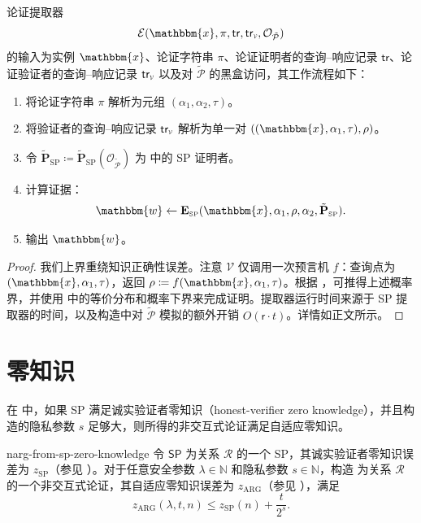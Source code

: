\documentclass[american,singlepageview]{snargs-book-zh}
\newcommand{\Malicious}[1]{\tilde{#1}}
\newcommand{\DefineEqual}{\coloneqq}
\newcommand{\BlackBox}[1]{\mathcal{O}_{#1}}
\newcommand{\Naturals}{\mathbb{N}}
\newcommand{\Relation}{\mathcal{R}}
\newcommand{\Instance}{\mathbbm{x}}
\newcommand{\Witness}{\mathbbm{w}}
\newcommand{\InstanceSize}{n}
\newcommand{\ProtoProver}{P}
\newcommand{\ProtoVerifier}{V}
\newcommand{\ProtoExtractor}{E}
\newcommand{\ProtoSalt}{\tau}
\newcommand{\ProtoZKError}{z}
\newcommand{\ProtoRandomnessComplexity}{\mathsf{r}}
\newcommand{\SPSymbol}{\mathsf{SP}}
\newcommand{\SPSubscript}{\scriptscriptstyle\mathrm{SP}}
\newcommand{\SPFormat}[1]{\mathbf{#1}}
\newcommand{\SPExtractor}{\SPFormat{\ProtoExtractor}_{\SPSubscript}}
\newcommand{\SPZKError}{\ProtoZKError_{\SPSubscript}}
\newcommand{\SPMaliciousProver}{\Malicious{\SPFormat{\ProtoProver}}_{\SPSubscript}}
\newcommand{\SPCommitment}{\alpha_{1}}
\newcommand{\SPChallenge}{\rho}
\newcommand{\SPResponse}{\alpha_{2}}
\newcommand{\SPRandomnessComplexity}{\ProtoRandomnessComplexity}
\newcommand{\ARGSubscript}{\scriptscriptstyle\mathrm{ARG}}
\newcommand{\ARGFormat}[1]{\mathcal{#1}}
\newcommand{\ARGProver}{\ARGFormat{\ProtoProver}}
\newcommand{\ARGVerifier}{\ARGFormat{\ProtoVerifier}}
\newcommand{\ARGExtractor}{\ARGFormat{\ProtoExtractor}}
\newcommand{\ARGString}{\pi}
\newcommand{\ARGZKError}{\ProtoZKError_{\ARGSubscript}}
\newcommand{\ROFunction}{f}
\newcommand{\ROQueryBound}{t}
\newcommand{\SecurityParameter}{\lambda}
\newcommand{\PrivacyParameter}{s}
\newcommand{\ROTrace}{\mathsf{tr}}
\newcommand{\ROTraceVerifier}{\ROTrace_{\scalebox{0.5}{$\ARGVerifier$}}}
\newcommand{\RandSaltString}{\ProtoSalt}
\newcommand{\RandSaltSize}{s}
\newcommand{\SPFSARGString}{(\SPCommitment,\SPResponse,\RandSaltString)}
\newcommand{\FSSPZKExpression}{\SPZKError(\InstanceSize)+\frac{\ROQueryBound}{2^{\RandSaltSize}}}
\begin{document}
\begin{construction}
\label{construction:fs-for-sp-adaptive-extractor}
论证提取器
\[
  \ARGExtractor(\Instance,\ARGString,\ROTrace,\ROTraceVerifier,\BlackBox{\Malicious{\ARGProver}})
\]
的输入为实例 $\Instance$、论证字符串 $\ARGString$、论证证明者的查询–响应记录 $\ROTrace$、论证验证者的查询–响应记录 $\ROTraceVerifier$ 以及对 $\Malicious{\ARGProver}$ 的黑盒访问，其工作流程如下：
\begin{enumerate}[nolistsep]
  \item 将论证字符串 $\ARGString$ 解析为元组 $\SPFSARGString$。
  \item 将验证者的查询–响应记录 $\ROTraceVerifier$ 解析为单一对
    $((\Instance,\SPCommitment,\RandSaltString),\SPChallenge)$。
  \item 令
    \(\SPMaliciousProver\DefineEqual \SPMaliciousProver(\BlackBox{\Malicious{\ARGProver}})\)
    为  中的 SP 证明者。
  \item 计算证据：
    \[
      \Witness
      \gets
      \SPExtractor(\Instance,\SPCommitment,\SPChallenge,\SPResponse,\SPMaliciousProver).
    \]
  \item 输出 $\Witness$。
\end{enumerate}
\end{construction}

\begin{proof}
我们上界重绕知识正确性误差。注意 $\ARGVerifier$ 仅调用一次预言机 $\ROFunction$：查询点为 $(\Instance,\SPCommitment,\RandSaltString)$，返回
\(\SPChallenge\DefineEqual\ROFunction(\Instance,\SPCommitment,\RandSaltString)\)。根据 ，可推得上述概率界，并使用  中的等价分布和概率下界来完成证明。提取器运行时间来源于 SP 提取器的时间，以及构造中对 $\Malicious{\ARGProver}$ 模拟的额外开销 $O(\SPRandomnessComplexity\cdot\ROQueryBound)$。详情如正文所示。
\end{proof}

\section{零知识}
\label{section:narg-from-sp-zero-knowledge}

在  中，如果 SP 满足诚实验证者零知识（honest-verifier zero knowledge），并且构造的隐私参数 $\PrivacyParameter$ 足够大，则所得的非交互式论证满足自适应零知识。

\begin{ImportantTheorem}{}{narg-from-sp-zero-knowledge}
令 $\SPSymbol$ 为关系 $\Relation$ 的一个 SP，其诚实验证者零知识误差为 $\SPZKError$（参见 ）。对于任意安全参数 $\SecurityParameter\in\Naturals$ 和隐私参数 $\PrivacyParameter\in\Naturals$，构造  为关系 $\Relation$ 的一个非交互式论证，其自适应零知识误差为 $\ARGZKError$（参见 ），满足
\[
  \ARGZKError(\SecurityParameter,\ROQueryBound,\InstanceSize)
  \le
  \FSSPZKExpression.
\]
\end{ImportantTheorem}
\end{document}
